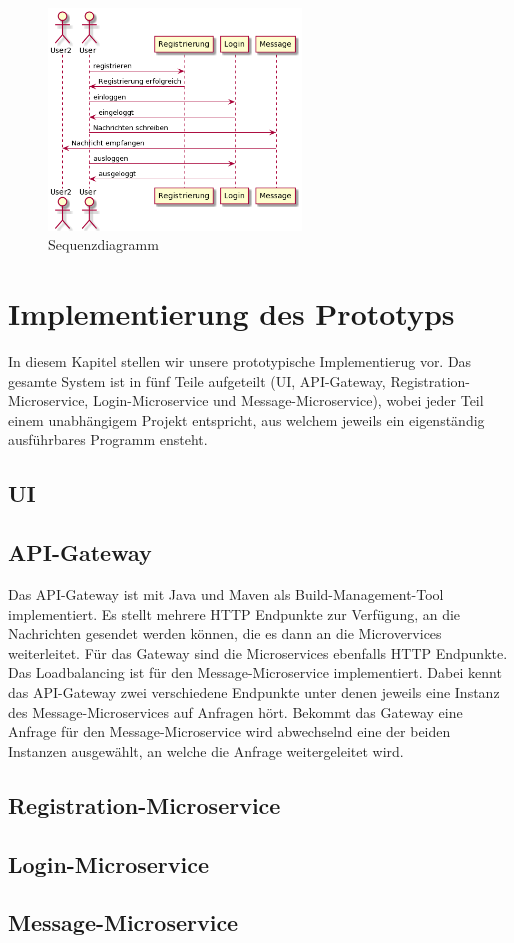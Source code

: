 \begin{figure}[bth] 
	\centering
	\includegraphics[width=0.6\textwidth]{Graphics/Sequenzdiagramm.png}
	\caption{Sequenzdiagramm}
\end{figure}

\section{Implementierung des Prototyps}

In diesem Kapitel stellen wir unsere prototypische Implementierug vor. Das gesamte System ist in fünf Teile aufgeteilt (UI, API-Gateway, Registration-Microservice, Login-Microservice und Message-Microservice), wobei jeder Teil einem unabhängigem Projekt entspricht, aus welchem jeweils ein eigenständig ausführbares Programm ensteht.

\subsection{UI}

\subsection{API-Gateway}
Das API-Gateway ist mit Java und Maven als Build-Management-Tool implementiert. Es stellt mehrere HTTP Endpunkte zur Verfügung, an die Nachrichten gesendet werden können, die es dann an die Microvervices weiterleitet. Für das Gateway sind die Microservices ebenfalls HTTP Endpunkte.
Das Loadbalancing ist für den Message-Microservice implementiert. Dabei kennt das API-Gateway zwei verschiedene Endpunkte unter denen jeweils eine Instanz des Message-Microservices auf Anfragen hört. Bekommt das Gateway eine Anfrage für den Message-Microservice wird abwechselnd eine der beiden Instanzen ausgewählt, an welche die Anfrage weitergeleitet wird.

\subsection{Registration-Microservice}

\subsection{Login-Microservice}

\subsection{Message-Microservice}